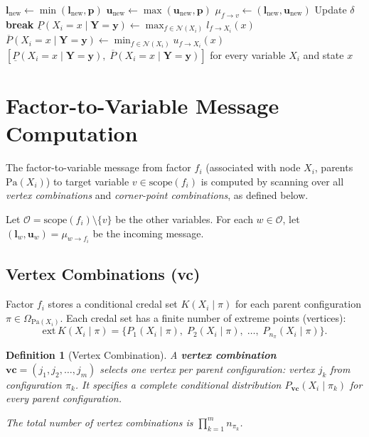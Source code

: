 \documentclass[11pt]{article}
\newtheorem{definition}{Definition}
\begin{document}
\begin{algorithm}[H]
\begin{algorithmic}[1]
        \State $\mathbf{l}_{\mathrm{new}} \gets \min(\mathbf{l}_{\mathrm{new}}, \mathbf{p})$
        \State $\mathbf{u}_{\mathrm{new}} \gets \max(\mathbf{u}_{\mathrm{new}}, \mathbf{p})$
      \EndFor
    \EndFor
    \State $\mu_{f \to v} \gets (\mathbf{l}_{\mathrm{new}}, \mathbf{u}_{\mathrm{new}})$
    \State Update $\delta$
  \EndFor
  \If{$\delta < \tau$} \textbf{break} \EndIf
\EndFor
\Statex
{}
    \State $\underline{P}(X_i{=}x \mid \mathbf{Y}{=}\mathbf{y}) \gets \max_{f \in \mathcal{N}(X_i)} l_{f \to X_i}(x)$
    \State $\overline{P}(X_i{=}x \mid \mathbf{Y}{=}\mathbf{y}) \gets \min_{f \in \mathcal{N}(X_i)} u_{f \to X_i}(x)$
  \EndFor
\EndFor
\State \Return $[\underline{P}(X_i{=}x \mid \mathbf{Y}{=}\mathbf{y}),\; \overline{P}(X_i{=}x \mid \mathbf{Y}{=}\mathbf{y})]$ for every variable $X_i$ and state $x$
\end{algorithmic}
\end{algorithm}

\section{Factor-to-Variable Message Computation}\label{sec:ftov}

The factor-to-variable message from factor $f_i$ (associated with node $X_i$,
parents $\mathrm{Pa}(X_i)$) to target variable $v \in \mathrm{scope}(f_i)$
is computed by scanning over all \emph{vertex combinations} and
\emph{corner-point combinations}, as defined below.

Let $\mathcal{O} = \mathrm{scope}(f_i) \setminus \{v\}$ be the other variables.
For each $w \in \mathcal{O}$, let $(\mathbf{l}_{w}, \mathbf{u}_{w}) = \mu_{w \to f_i}$ be the incoming message.

\subsection{Vertex Combinations (vc)}\label{sec:vc}

Factor $f_i$ stores a conditional credal set $K(X_i \mid \pi)$ for each parent
configuration $\pi \in \Omega_{\mathrm{Pa}(X_i)}$. Each credal set has a finite
number of extreme points (vertices):
\[
  \mathrm{ext}\,K(X_i \mid \pi) = \{P_1(X_i \mid \pi),\; P_2(X_i \mid \pi),\; \dots,\; P_{n_\pi}(X_i \mid \pi)\}.
\]

\begin{definition}[Vertex Combination]
A \textbf{vertex combination} $\mathbf{vc} = (j_1, j_2, \dots, j_m)$ selects one vertex per parent
configuration: vertex $j_k$ from configuration $\pi_k$. It specifies a complete conditional
distribution $P_{\mathbf{vc}}(X_i \mid \pi_k)$ for every parent configuration.

The total number of vertex combinations is $\prod_{k=1}^{m} n_{\pi_k}$.
\end{definition}
\end{document}
